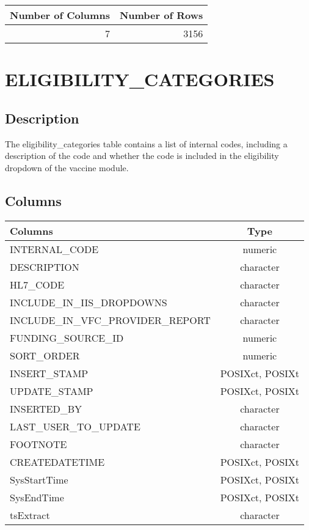 \documentclass[
  letterpaper,
  DIV=11,
  numbers=noendperiod]{scrreprt}
\begin{document}
\begin{longtable}{rr}
\toprule
Number of Columns & Number of Rows \\ 
\midrule
7 & 3156 \\ 
\bottomrule
\end{longtable}

\hypertarget{eligibility_categories}{%
\chapter*{ELIGIBILITY\_CATEGORIES}\label{eligibility_categories}}

\hypertarget{description-7}{%
\section*{Description}\label{description-7}}

The eligibility\_categories table contains a list of internal codes,
including a description of the code and whether the code is included in
the eligibility dropdown of the vaccine module.

\hypertarget{columns-7}{%
\section*{Columns}\label{columns-7}}

\begin{longtable}{lc}
\toprule
Columns & Type \\ 
\midrule
INTERNAL\_CODE & numeric \\ 
DESCRIPTION & character \\ 
HL7\_CODE & character \\ 
INCLUDE\_IN\_IIS\_DROPDOWNS & character \\ 
INCLUDE\_IN\_VFC\_PROVIDER\_REPORT & character \\ 
FUNDING\_SOURCE\_ID & numeric \\ 
SORT\_ORDER & numeric \\ 
INSERT\_STAMP & POSIXct, POSIXt \\ 
UPDATE\_STAMP & POSIXct, POSIXt \\ 
INSERTED\_BY & character \\ 
LAST\_USER\_TO\_UPDATE & character \\ 
FOOTNOTE & character \\ 
CREATEDATETIME & POSIXct, POSIXt \\ 
SysStartTime & POSIXct, POSIXt \\ 
SysEndTime & POSIXct, POSIXt \\ 
tsExtract & character \\ 
\bottomrule
\end{longtable}
\end{document}
